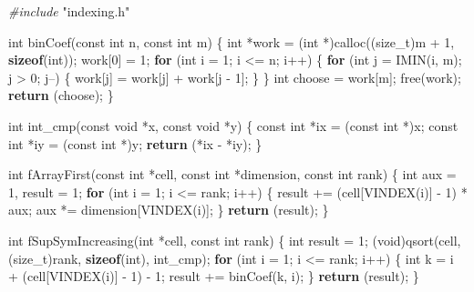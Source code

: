 \documentclass[12pt,]{article}
\newenvironment{Shaded}{\begin{snugshade}}{\end{snugshade}}
\newcommand{\KeywordTok}[1]{\textcolor[rgb]{0.13,0.29,0.53}{\textbf{#1}}}
\newcommand{\DataTypeTok}[1]{\textcolor[rgb]{0.13,0.29,0.53}{#1}}
\newcommand{\DecValTok}[1]{\textcolor[rgb]{0.00,0.00,0.81}{#1}}
\newcommand{\ImportTok}[1]{#1}
\newcommand{\ControlFlowTok}[1]{\textcolor[rgb]{0.13,0.29,0.53}{\textbf{#1}}}
\newcommand{\PreprocessorTok}[1]{\textcolor[rgb]{0.56,0.35,0.01}{\textit{#1}}}
\newcommand{\NormalTok}[1]{#1}
\begin{document}
\begin{Shaded}
\begin{Highlighting}[]

\PreprocessorTok{#include }\ImportTok{"indexing.h"}

\DataTypeTok{int}\NormalTok{ binCoef(}\DataTypeTok{const} \DataTypeTok{int}\NormalTok{ n, }\DataTypeTok{const} \DataTypeTok{int}\NormalTok{ m) \{}
    \DataTypeTok{int}\NormalTok{ *work = (}\DataTypeTok{int}\NormalTok{ *)calloc((}\DataTypeTok{size_t}\NormalTok{)m + }\DecValTok{1}\NormalTok{, }\KeywordTok{sizeof}\NormalTok{(}\DataTypeTok{int}\NormalTok{));}
\NormalTok{    work[}\DecValTok{0}\NormalTok{] = }\DecValTok{1}\NormalTok{;}
    \ControlFlowTok{for}\NormalTok{ (}\DataTypeTok{int}\NormalTok{ i = }\DecValTok{1}\NormalTok{; i <= n; i++) \{}
        \ControlFlowTok{for}\NormalTok{ (}\DataTypeTok{int}\NormalTok{ j = IMIN(i, m); j > }\DecValTok{0}\NormalTok{; j--) \{}
\NormalTok{            work[j] = work[j] + work[j - }\DecValTok{1}\NormalTok{];}
\NormalTok{        \}}
\NormalTok{    \}}
    \DataTypeTok{int}\NormalTok{ choose = work[m];}
\NormalTok{    free(work);}
    \ControlFlowTok{return}\NormalTok{ (choose);}
\NormalTok{\}}

\DataTypeTok{int}\NormalTok{ int_cmp(}\DataTypeTok{const} \DataTypeTok{void}\NormalTok{ *x, }\DataTypeTok{const} \DataTypeTok{void}\NormalTok{ *y) \{}
    \DataTypeTok{const} \DataTypeTok{int}\NormalTok{ *ix = (}\DataTypeTok{const} \DataTypeTok{int}\NormalTok{ *)x;}
    \DataTypeTok{const} \DataTypeTok{int}\NormalTok{ *iy = (}\DataTypeTok{const} \DataTypeTok{int}\NormalTok{ *)y;}
    \ControlFlowTok{return}\NormalTok{ (*ix - *iy);}
\NormalTok{\}}

\DataTypeTok{int}\NormalTok{ fArrayFirst(}\DataTypeTok{const} \DataTypeTok{int}\NormalTok{ *cell, }\DataTypeTok{const} \DataTypeTok{int}\NormalTok{ *dimension, }\DataTypeTok{const} \DataTypeTok{int}\NormalTok{ rank) \{}
    \DataTypeTok{int}\NormalTok{ aux = }\DecValTok{1}\NormalTok{, result = }\DecValTok{1}\NormalTok{;}
    \ControlFlowTok{for}\NormalTok{ (}\DataTypeTok{int}\NormalTok{ i = }\DecValTok{1}\NormalTok{; i <= rank; i++) \{}
\NormalTok{        result += (cell[VINDEX(i)] - }\DecValTok{1}\NormalTok{) * aux;}
\NormalTok{        aux *= dimension[VINDEX(i)];}
\NormalTok{    \}}
    \ControlFlowTok{return}\NormalTok{ (result);}
\NormalTok{\}}

\DataTypeTok{int}\NormalTok{ fSupSymIncreasing(}\DataTypeTok{int}\NormalTok{ *cell, }\DataTypeTok{const} \DataTypeTok{int}\NormalTok{ rank) \{}
    \DataTypeTok{int}\NormalTok{ result = }\DecValTok{1}\NormalTok{;}
\NormalTok{    (}\DataTypeTok{void}\NormalTok{)qsort(cell, (}\DataTypeTok{size_t}\NormalTok{)rank, }\KeywordTok{sizeof}\NormalTok{(}\DataTypeTok{int}\NormalTok{), int_cmp);}
    \ControlFlowTok{for}\NormalTok{ (}\DataTypeTok{int}\NormalTok{ i = }\DecValTok{1}\NormalTok{; i <= rank; i++) \{}
        \DataTypeTok{int}\NormalTok{ k = i + (cell[VINDEX(i)] - }\DecValTok{1}\NormalTok{) - }\DecValTok{1}\NormalTok{;}
\NormalTok{        result += binCoef(k, i);}
\NormalTok{    \}}
    \ControlFlowTok{return}\NormalTok{ (result);}
\NormalTok{\}}


\end{Highlighting}
\end{Shaded}
\end{document}
